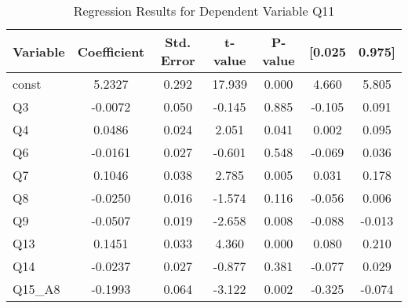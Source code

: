 \begin{table}[H]
  \centering
  \caption{Regression Results for Dependent Variable Q11}\label{tab:regression_q11}
  \begin{tabular}{lcccccc}
    \toprule
    \textbf{Variable} & \textbf{Coefficient} & \textbf{Std. Error} & \textbf{t-value} & \textbf{P-value} & \textbf{[0.025} & \textbf{0.975]} \\
    \midrule
    const   & 5.2327 & 0.292 & 17.939 & 0.000 & 4.660 & 5.805 \\
    Q3      & -0.0072 & 0.050 & -0.145 & 0.885 & -0.105 & 0.091 \\
    Q4      & 0.0486 & 0.024 & 2.051 & 0.041 & 0.002 & 0.095 \\
    Q6      & -0.0161 & 0.027 & -0.601 & 0.548 & -0.069 & 0.036 \\
    Q7      & 0.1046 & 0.038 & 2.785 & 0.005 & 0.031 & 0.178 \\
    Q8      & -0.0250 & 0.016 & -1.574 & 0.116 & -0.056 & 0.006 \\
    Q9      & -0.0507 & 0.019 & -2.658 & 0.008 & -0.088 & -0.013 \\
    Q13     & 0.1451 & 0.033 & 4.360 & 0.000 & 0.080 & 0.210 \\
    Q14     & -0.0237 & 0.027 & -0.877 & 0.381 & -0.077 & 0.029 \\
    Q15\_A8 & -0.1993 & 0.064 & -3.122 & 0.002 & -0.325 & -0.074 \\
    \bottomrule
  \end{tabular}
\end{table}